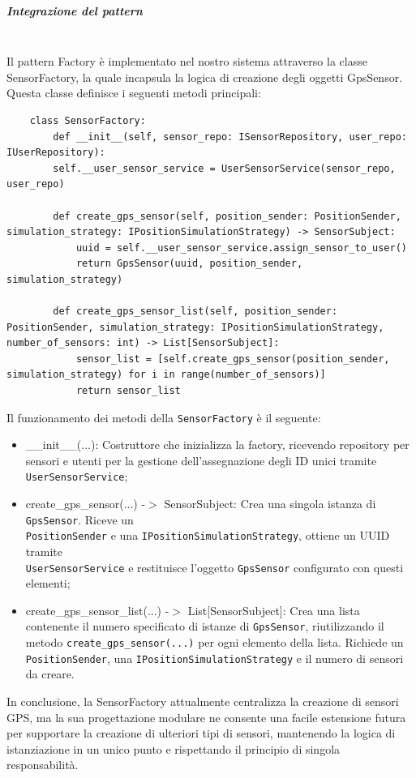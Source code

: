 \documentclass[10pt]{article}
\newcommand{\mysubparagraph}[1]{\subparagraph{#1}\mbox{}\\}
\begin{document}
    \mysubparagraph{Integrazione del pattern}
    Il pattern Factory è implementato nel nostro sistema attraverso la classe SensorFactory, la quale incapsula la logica di creazione degli oggetti GpsSensor. Questa classe definisce i seguenti metodi principali:
    \begin{lstlisting}
    class SensorFactory:
        def __init__(self, sensor_repo: ISensorRepository, user_repo: IUserRepository):
        self.__user_sensor_service = UserSensorService(sensor_repo, user_repo)

        def create_gps_sensor(self, position_sender: PositionSender, simulation_strategy: IPositionSimulationStrategy) -> SensorSubject:
            uuid = self.__user_sensor_service.assign_sensor_to_user()
            return GpsSensor(uuid, position_sender, simulation_strategy)

        def create_gps_sensor_list(self, position_sender: PositionSender, simulation_strategy: IPositionSimulationStrategy, number_of_sensors: int) -> List[SensorSubject]:
            sensor_list = [self.create_gps_sensor(position_sender, simulation_strategy) for i in range(number_of_sensors)]
            return sensor_list
    \end{lstlisting}
    Il funzionamento dei metodi della \texttt{SensorFactory} è il seguente:
    \begin{itemize}
        \item \_\_init\_\_(...): Costruttore che inizializza la factory, ricevendo repository per sensori e utenti per la gestione dell'assegnazione degli ID unici tramite \texttt{UserSensorService};
        \item create\_gps\_sensor(...) -$>$ SensorSubject: Crea una singola istanza di \texttt{GpsSensor}. Riceve un\\ \texttt{PositionSender} e una \texttt{IPositionSimulationStrategy}, ottiene un UUID tramite\\ \texttt{UserSensorService} e restituisce l'oggetto \texttt{GpsSensor} configurato con questi elementi;
        \item create\_gps\_sensor\_list(...) -$>$ List[SensorSubject]: Crea una lista contenente il numero specificato di istanze di \texttt{GpsSensor}, riutilizzando il metodo \texttt{create\_gps\_sensor(...)} per ogni elemento della lista. Richiede un \texttt{PositionSender}, una \texttt{IPositionSimulationStrategy} e il numero di sensori da creare.
    \end{itemize}
    In conclusione, la SensorFactory attualmente centralizza la creazione di sensori GPS, ma la sua progettazione modulare ne consente una facile estensione futura per supportare la creazione di ulteriori tipi di sensori, mantenendo la logica di istanziazione in un unico punto e rispettando il principio di singola responsabilità.
    
\end{document}
